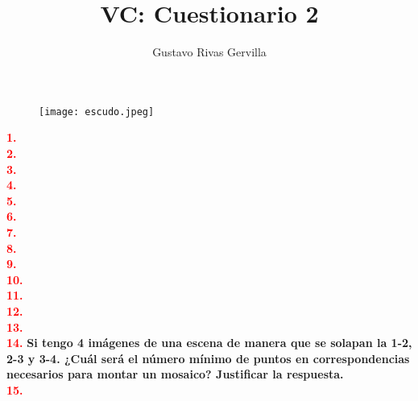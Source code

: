 \documentclass[10pt,a4paper]{article}
\author{Gustavo Rivas Gervilla}
\title{\textbf{VC: Cuestionario 2}}
\date{}
\begin{document}
\maketitle

\begin{figure}[H]
\centering
\texttt{[image: escudo.jpeg]}
\end{figure}

\newpage

\textcolor{red}{\textbf{1.}} \textbf{}\\

\textcolor{red}{\textbf{2.}} \textbf{}\\

\textcolor{red}{\textbf{3.}} \textbf{}\\

\textcolor{red}{\textbf{4.}} \textbf{}\\

\textcolor{red}{\textbf{5.}} \textbf{}\\

\textcolor{red}{\textbf{6.}} \textbf{}\\

\textcolor{red}{\textbf{7.}} \textbf{}\\

\textcolor{red}{\textbf{8.}} \textbf{}\\

\textcolor{red}{\textbf{9.}} \textbf{}\\

\textcolor{red}{\textbf{10.}} \textbf{}\\

\textcolor{red}{\textbf{11.}} \textbf{}\\

\textcolor{red}{\textbf{12.}} \textbf{}\\

\textcolor{red}{\textbf{13.}} \textbf{}\\

\textcolor{red}{\textbf{14.}} \textbf{Si tengo 4 imágenes de una escena de manera que se solapan la 1-2, 2-3 y 3-4. ¿Cuál será el número mínimo de puntos en correspondencias necesarios para montar un mosaico? Justificar la respuesta.}\\

\textcolor{red}{\textbf{15.}} \textbf{}\\
\end{document}
